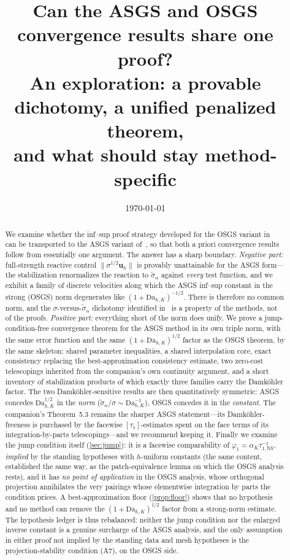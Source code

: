 \documentclass[11pt]{article}
\title{Can the ASGS and OSGS convergence results share one proof?\\[1ex]
\large An exploration: a provable dichotomy, a unified penalized theorem,\\
and what should stay method-specific}
\author{}
\date{\today}
\theoremstyle{remark}
\newcommand{\bu}{\boldsymbol{u}}
\newcommand{\norm}[1]{\lVert #1 \rVert}
\newcommand{\tns}{\tau_{1,\mathrm{NS}}}
\newcommand{\Dah}{\mathrm{Da}_{h,K}}
\newcommand{\st}{\widetilde{\sigma}_\alpha}
\begin{document}
\maketitle

\begin{abstract}
We examine whether the inf--sup proof strategy developed for the OSGS variant
in~\cite{OSGSnote} can be transported to the ASGS variant of~\cite{companion}, so
that both a priori convergence results follow from essentially one argument. The
answer has a sharp boundary. \emph{Negative part:} full-strength reactive control
$\norm{\sigma^{1/2}\bu_h}$ is provably unattainable for the ASGS form---the
stabilization renormalizes the reaction to $\st$ against \emph{every} test function,
and we exhibit a family of discrete velocities along which the ASGS inf--sup constant
in the strong (OSGS) norm degenerates like $(1+\Dah)^{-1/2}$. There is therefore no
common norm, and the $\sigma$-versus-$\st$ dichotomy identified in~\cite{OSGSnote} is
a property of the methods, not of the proofs. \emph{Positive part:} everything short
of the norm does unify. We prove a jump-condition-free convergence theorem for the
ASGS method in its own triple norm, with the same error function and the same
$(1+\Dah)^{1/2}$ factor as the OSGS theorem, by the same skeleton: shared parameter
inequalities, a shared interpolation core, exact consistency replacing the
best-approximation consistency estimate, two zero-cost telescopings inherited from
the companion's own continuity argument, and a short inventory of stabilization
products of which exactly three families carry the Damk\"ohler factor. The two Damk\"ohler-sensitive results are then
quantitatively symmetric: ASGS concedes $\Dah^{1/2}$ in the \emph{norm}
($\st/\sigma \sim \Dah^{-1}$), OSGS concedes it in the \emph{constant}. The
companion's Theorem~5.3 remains the sharper ASGS statement---its Damk\"ohler-freeness
is purchased by the facewise $[\tau_1]$-estimates spent on the face terms of its
integration-by-parts telescopings---and we recommend keeping it. Finally we examine
the jump condition itself (\cref{sec:jump}): it is a facewise comparability of
$\varphi_1 = \alpha_K\tns^{-1}$, \emph{implied} by the standing hypotheses with
$h$-uniform constants (the same content, established the same way, as the
patch-equivalence lemma on which the OSGS analysis rests), and it has \emph{no point
of application} in the OSGS analysis, whose orthogonal projection annihilates the
very pairings whose elementwise integration by parts the condition prices. A
best-approximation floor (\cref{prop:floor}) shows that no hypothesis and no method
can remove the $(1+\Dah)^{1/2}$ factor from a strong-norm estimate. The hypothesis
ledger is thus rebalanced: neither the jump condition nor the enlarged inverse
constant is a genuine surcharge of the ASGS analysis, and the only assumption in
either proof not implied by the standing data and mesh hypotheses is the
projection-stability condition (A7), on the OSGS side.
\end{abstract}
\end{document}
